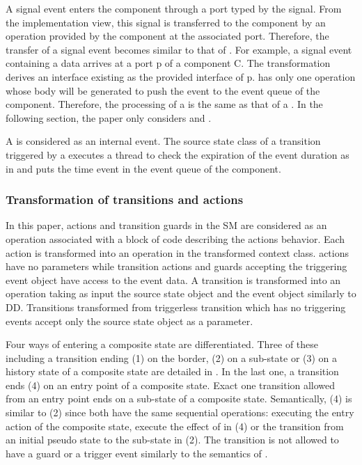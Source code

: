 A signal event enters the component through a port typed by the signal. From the implementation view, this signal is transferred to the component by an operation provided by the component at the associated port. Therefore, the transfer of a signal event becomes similar to that of . For example, a signal event containing a data  arrives at a port p of a component C. The transformation derives an interface  existing as the provided interface of p.  has only one operation  whose body will be generated to push the event to the event queue of the component. Therefore, the processing of a  is the same as that of a . In the following section, the paper only considers  and .

A  is considered as an internal event. The source state class of a transition triggered by a  executes a thread to check the expiration of the event duration as in \cite{Niaz2004} and puts the time event in the event queue of the component. 

\subsubsection{Transformation of transitions and actions}
\label{subsec:transitions}
In this paper, actions and transition guards in the SM are considered as an operation associated with a block of code describing the actions behavior. Each action is transformed into an operation in the transformed context class.  actions have no parameters while transition actions and guards accepting the triggering event object have access to the event data. A transition is transformed into an operation taking as input the source state object and the event object similarly to DD. Transitions transformed from triggerless transition which has no triggering events accept only the source state object as a parameter.

Four ways of entering a composite state are differentiated. Three of these including a transition ending (1) on the border, (2) on a sub-state or (3) on a history state of a composite state are detailed in \cite{spinke_object-oriented_2013}. In the last one, a transition  ends (4) on an entry point of a composite state. Exact one transition  allowed from an entry point ends on a sub-state of a composite state. Semantically, (4) is similar to (2) since both have the same sequential operations: executing the entry action of the composite state, execute the effect of  in (4) or the transition  from an initial pseudo state to the sub-state in (2). The transition  is not allowed to have a guard or a trigger event similarly to the semantics of . 

